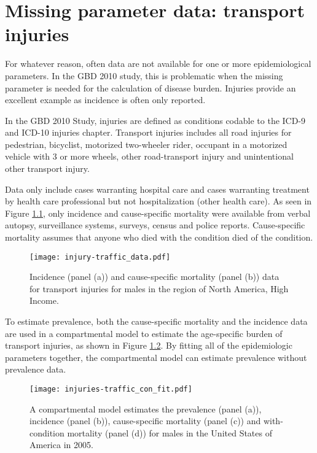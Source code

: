 \chapter{Missing parameter data: transport injuries}
\label{applications-double_dismod}

For whatever reason, often data are not available for one or more epidemiological parameters.  In the GBD 2010 study, this is problematic when the missing parameter is needed for the calculation of disease burden.  Injuries provide an excellent example as incidence is often only reported.

In the GBD 2010 Study, injuries are defined as conditions codable to the ICD-9 and ICD-10 injuries chapter.  Transport injuries includes all road injuries for pedestrian, bicyclist, motorized two-wheeler rider, occupant in a motorized vehicle with 3 or more wheels, other road-transport injury and unintentional other transport injury.

Data only include cases warranting hospital care and cases warranting treatment by health care professional but not hospitalization (other health care).  As seen in Figure \ref{fig:app-injury traffic data}, only incidence and cause-specific mortality were available from verbal autopsy, surveillance systems, surveys, census and police reports.  Cause-specific mortality assumes that anyone who died with the condition died of the condition.

    \begin{figure}[h]
        \begin{center}
            \texttt{[image: injury-traffic\_data.pdf]}
            \caption{Incidence (panel (a)) and cause-specific mortality (panel (b)) data for transport injuries for males in the region of North America, High Income.}
            \label{fig:app-injury traffic data}
        \end{center}
    \end{figure}

To estimate prevalence, both the cause-specific mortality and the incidence data are used in a compartmental model to estimate the age-specific burden of transport injuries, as shown in Figure \ref{fig:app-injury traffic fit}.  By fitting all of the epidemiologic parameters together, the compartmental model can estimate prevalence without prevalence data.

    \begin{figure}[h]
        \begin{center}
            \texttt{[image: injuries-traffic\_con\_fit.pdf]}
            \caption{A compartmental model estimates the prevalence (panel (a)), incidence (panel (b)), cause-specific mortality (panel (c)) and with-condition mortality (panel (d)) for males in the United States of America in 2005.}
            \label{fig:app-injury traffic fit}
        \end{center}
    \end{figure}

